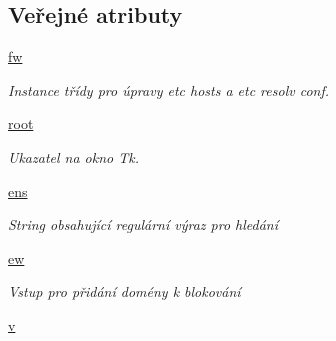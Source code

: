 \subsection*{Veřejné atributy}
\begin{DoxyCompactItemize}
\item 
\hypertarget{classmnEnDis_1_1App_a217656b4479c67c5c9307324200a36a0}{\hyperlink{classmnEnDis_1_1App_a217656b4479c67c5c9307324200a36a0}{fw}}\label{d3/d4e/classmnEnDis_1_1App_a217656b4479c67c5c9307324200a36a0}

\begin{DoxyCompactList}\small\item\em Instance třídy pro úpravy etc hosts a etc resolv conf. \end{DoxyCompactList}\item 
\hypertarget{classmnEnDis_1_1App_ace76e4f1ae369e83cd7f8f827b1615f6}{\hyperlink{classmnEnDis_1_1App_ace76e4f1ae369e83cd7f8f827b1615f6}{root}}\label{d3/d4e/classmnEnDis_1_1App_ace76e4f1ae369e83cd7f8f827b1615f6}

\begin{DoxyCompactList}\small\item\em Ukazatel na okno Tk. \end{DoxyCompactList}\item 
\hypertarget{classmnEnDis_1_1App_a19246a61ca31b63c982bdfd118af4340}{\hyperlink{classmnEnDis_1_1App_a19246a61ca31b63c982bdfd118af4340}{ens}}\label{d3/d4e/classmnEnDis_1_1App_a19246a61ca31b63c982bdfd118af4340}

\begin{DoxyCompactList}\small\item\em String obsahující regulární výraz pro hledání \end{DoxyCompactList}\item 
\hypertarget{classmnEnDis_1_1App_a410cba0728f165e5ee0a37f920fcd2ed}{\hyperlink{classmnEnDis_1_1App_a410cba0728f165e5ee0a37f920fcd2ed}{ew}}\label{d3/d4e/classmnEnDis_1_1App_a410cba0728f165e5ee0a37f920fcd2ed}

\begin{DoxyCompactList}\small\item\em Vstup pro přidání domény k blokování \end{DoxyCompactList}\item 
\hypertarget{classmnEnDis_1_1App_a02917859d52a16c3d7aa82bb4ae0bc7a}{\hyperlink{classmnEnDis_1_1App_a02917859d52a16c3d7aa82bb4ae0bc7a}{v}}\label{d3/d4e/classmnEnDis_1_1App_a02917859d52a16c3d7aa82bb4ae0bc7a}


\end{DoxyCompactItemize}
